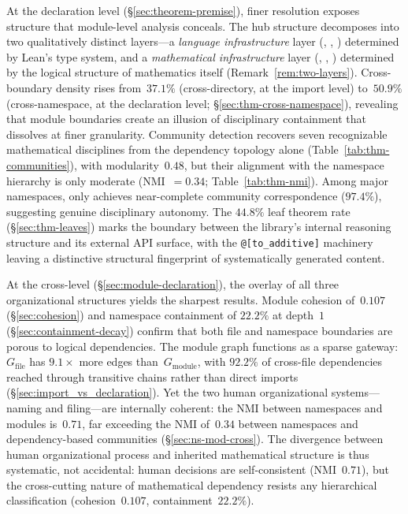 At the declaration level (\S\ref{sec:theorem-premise}), finer resolution exposes structure that module-level analysis conceals. The hub structure decomposes into two qualitatively distinct layers---a \emph{language infrastructure} layer (, , ) determined by Lean's type system, and a \emph{mathematical infrastructure} layer (, , ) determined by the logical structure of mathematics itself (Remark~\ref{rem:two-layers}). Cross-boundary density rises from~$37.1\%$ (cross-directory, at the import level) to~$50.9\%$ (cross-namespace, at the declaration level; \S\ref{sec:thm-cross-namespace}), revealing that module boundaries create an illusion of disciplinary containment that dissolves at finer granularity. Community detection recovers seven recognizable mathematical disciplines from the dependency topology alone (Table~\ref{tab:thm-communities}), with modularity~$0.48$, but their alignment with the namespace hierarchy is only moderate (NMI~$= 0.34$; Table~\ref{tab:thm-nmi}). Among major namespaces, only  achieves near-complete community correspondence ($97.4\%$), suggesting genuine disciplinary autonomy. The $44.8\%$ leaf theorem rate (\S\ref{sec:thm-leaves}) marks the boundary between the library's internal reasoning structure and its external API surface, with the \texttt{@[to\_additive]} machinery leaving a distinctive structural fingerprint of systematically generated content.

At the cross-level (\S\ref{sec:module-declaration}), the overlay of all three organizational structures yields the sharpest results. Module cohesion of~$0.107$ (\S\ref{sec:cohesion}) and namespace containment of $22.2\%$ at depth~$1$ (\S\ref{sec:containment-decay}) confirm that both file and namespace boundaries are porous to logical dependencies. The module graph functions as a sparse gateway: $G_{\mathrm{file}}$ has $9.1\times$ more edges than~$G_{\mathrm{module}}$, with $92.2\%$ of cross-file dependencies reached through transitive chains rather than direct imports (\S\ref{sec:import_vs_declaration}). Yet the two human organizational systems---naming and filing---are internally coherent: the NMI between namespaces and modules is~$0.71$, far exceeding the NMI of~$0.34$ between namespaces and dependency-based communities (\S\ref{sec:ns-mod-cross}). The divergence between human organizational process and inherited mathematical structure is thus systematic, not accidental: human decisions are self-consistent (NMI~$0.71$), but the cross-cutting nature of mathematical dependency resists any hierarchical classification (cohesion~$0.107$, containment~$22.2\%$).

